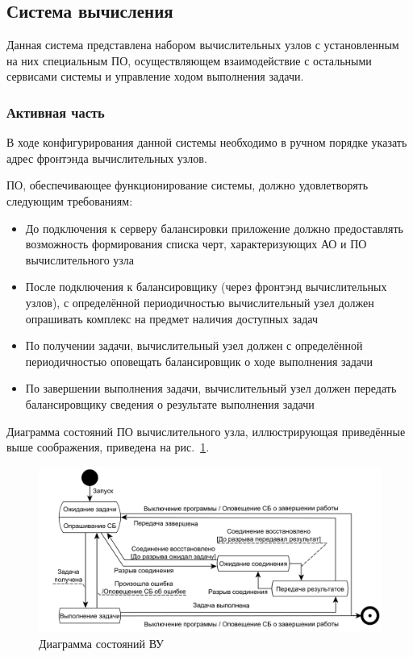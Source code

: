 \documentclass[a4paper,12pt]{report}
\numberwithin{equation}{section}
\begin{document}
  \subsection{Система вычисления}
  Данная система представлена набором вычислительных узлов с установленным на них специальным ПО, 
  осуществляющем взаимодействие с остальными сервисами системы и управление ходом выполнения задачи.
  
  \subsubsection{Активная часть}
  В ходе конфигурирования данной системы необходимо в ручном порядке указать адрес фронтэнда вычислительных узлов.
  
  ПО, обеспечивающее функционирование системы, должно удовлетворять следующим требованиям:
  \begin{itemize}
    \item До подключения к серверу балансировки приложение должно предоставлять возможность формирования списка черт, характеризующих АО и ПО вычислительного узла
    \item После подключения к балансировщику (через фронтэнд вычислительных узлов), с определённой периодичностью вычислительный узел должен опрашивать комплекс на предмет наличия доступных задач
    \item По получении задачи, вычислительный узел должен с определённой периодичностью оповещать балансировщик о ходе выполнения задачи
    \item По завершении выполнения задачи, вычислительный узел должен передать балансировщику сведения о результате выполнения задачи
  \end{itemize}
  
  Диаграмма состояний ПО вычислительного узла, иллюстрирующая приведённые выше соображения, приведена на рис.~\ref{fig:node-state}.
  
  \begin{figure}
    \centering
    \includegraphics[width=\linewidth]{diagrams/compnode/state}
    \caption{Диаграмма состояний ВУ}
    \label{fig:node-state}
  \end{figure}
  
\end{document}
